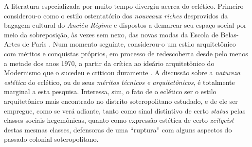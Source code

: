 A literatura especializada por muito tempo divergiu acerca do eclético. Primeiro considerou-o como o estilo ostentatório dos \textit{nouveaux riches} desprovidos da bagagem cultural do \textit{Ancièn Régime} e dispostos a demarcar seu espaço social por meio da sobreposição, às vezes sem nexo, das novas modas da Escola de Belas-Artes de Paris \cite[pp.~315-319]{guerrand_espacos_2009}. Num momento seguinte, considerou-o um estilo arquitetônico com méritos e conquistas próprios, em processo de redescoberta desde pelo menos a metade dos anos 1970, a partir da crítica ao ideário arquitetônico do Modernismo que o sucedeu e criticou duramente \cite{almeida_victoria_1997, almeida_vitrinescomercio_2014, patetta_ecletismo_1987, puppi_hisnamod_1998}. A discussão sobre a \textit{natureza estética} do eclético, ou de seus \textit{méritos técnicos e arquitetônicos}, é totalmente marginal a esta pesquisa. Interessa, sim, o fato de o eclético ser o estilo arquitetônico mais encontrado no distrito soteropolitano estudado, e de ele ser empregue, como se verá adiante, tanto como sinal distintivo de certo \textit{status} pelas classes sociais hegemônicas, quanto como expressão estética de certo \textit{zeitgeist} destas mesmas classes, defensoras de uma ``ruptura'' com alguns aspectos do passado colonial soteropolitano.


